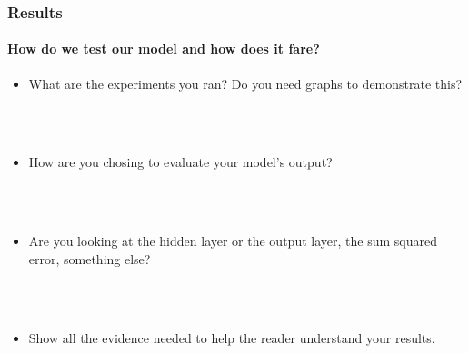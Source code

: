 \documentclass{beamer}
\begin{document}
\begin{frame}
\frametitle{Results}
\framesubtitle{How do we test our model and how does it fare?}
\begin{itemize}[<+->]
\item What are the experiments you ran? Do you need graphs to demonstrate this?


\ \\

\ \\

\item How are you chosing to evaluate your model's output?


\ \\

\ \\

\item Are you looking at the hidden layer or the output layer, the sum squared error, something else?

\ \\ 

\ \\

\item Show all the evidence needed to help the reader understand your results.


\end{itemize}
\end{frame}
\end{document}
